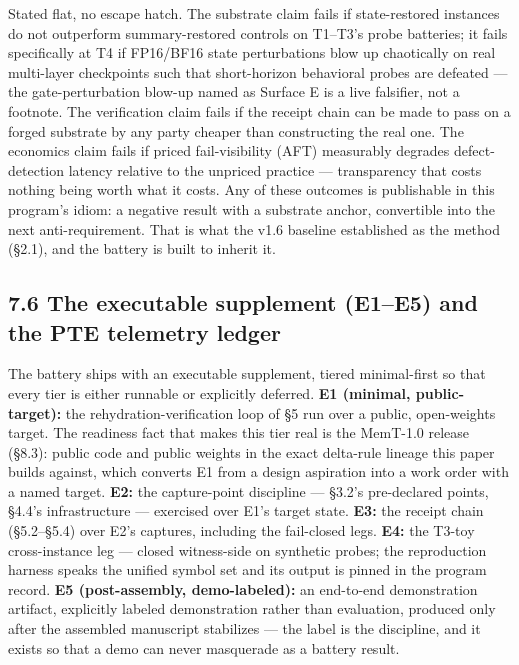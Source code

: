 \documentclass[11pt]{article}
\begin{document}
Stated flat, no escape hatch. The substrate claim fails if state-restored instances do not outperform summary-restored controls on T1--T3's probe batteries; it fails specifically at T4 if FP16/BF16 state perturbations blow up chaotically on real multi-layer checkpoints such that short-horizon behavioral probes are defeated --- the gate-perturbation blow-up named as Surface E is a live falsifier, not a footnote. The verification claim fails if the receipt chain can be made to pass on a forged substrate by any party cheaper than constructing the real one. The economics claim fails if priced fail-visibility (AFT) measurably degrades defect-detection latency relative to the unpriced practice --- transparency that costs nothing being worth what it costs. Any of these outcomes is publishable in this program's idiom: a negative result with a substrate anchor, convertible into the next anti-requirement. That is what the v1.6 baseline established as the method (\S{}2.1), and the battery is built to inherit it.

\subsection{7.6 The executable supplement (E1--E5) and the PTE telemetry ledger}\label{the-executable-supplement-e1e5-and-the-pte-telemetry-ledger}

The battery ships with an executable supplement, tiered minimal-first so that every tier is either runnable or explicitly deferred. \textbf{E1 (minimal, public-target):} the rehydration-verification loop of \S{}5 run over a public, open-weights target. The readiness fact that makes this tier real is the MemT-1.0 release (\S{}8.3): public code and public weights in the exact delta-rule lineage this paper builds against, which converts E1 from a design aspiration into a work order with a named target. \textbf{E2:} the capture-point discipline --- \S{}3.2's pre-declared points, \S{}4.4's infrastructure --- exercised over E1's target state. \textbf{E3:} the receipt chain (\S{}5.2--\S{}5.4) over E2's captures, including the fail-closed legs. \textbf{E4:} the T3-toy cross-instance leg --- closed witness-side on synthetic probes; the reproduction harness speaks the unified symbol set and its output is pinned in the program record. \textbf{E5 (post-assembly, demo-labeled):} an end-to-end demonstration artifact, explicitly labeled demonstration rather than evaluation, produced only after the assembled manuscript stabilizes --- the label is the discipline, and it exists so that a demo can never masquerade as a battery result.
\end{document}

